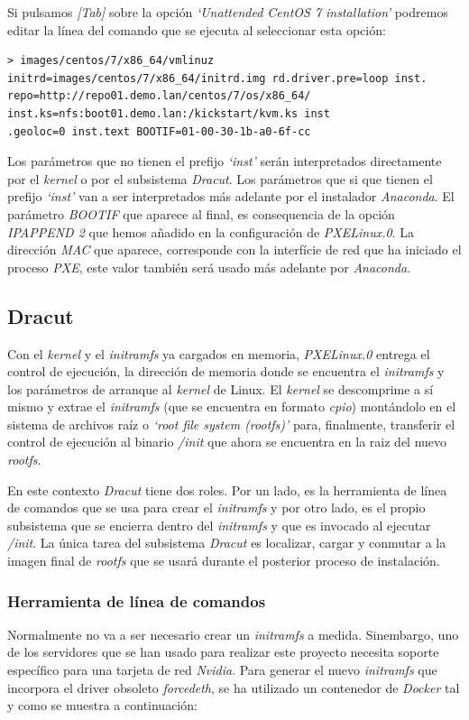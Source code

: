 \documentclass[a4paper,12pt,spanish,final]{epsc_tfc_pfc}
\begin{document}
Si pulsamos \emph{[Tab]} sobre la opción \emph{`Unattended CentOS 7 installation'} podremos editar la línea del comando que se ejecuta al seleccionar esta opción:\\

\begin{lstlisting}[style=dnsmasq]
> images/centos/7/x86_64/vmlinuz initrd=images/centos/7/x86_64/initrd.img rd.driver.pre=loop inst.
repo=http://repo01.demo.lan/centos/7/os/x86_64/ inst.ks=nfs:boot01.demo.lan:/kickstart/kvm.ks inst
.geoloc=0 inst.text BOOTIF=01-00-30-1b-a0-6f-cc
\end{lstlisting}

Los parámetros que no tienen el prefijo \emph{`inst'} serán interpretados directamente por el \emph{kernel} o por el subsistema \emph{Dracut}. Los parámetros que si que tienen el prefijo \emph{`inst'} van a ser interpretados más adelante por el instalador \emph{Anaconda}. El parámetro \emph{BOOTIF} que aparece al final, es consequencia de la opción \emph{IPAPPEND 2} que hemos añadido en la configuración de \emph{PXELinux.0}. La dirección \emph{MAC} que aparece, corresponde con la interfície de red que ha iniciado el proceso \emph{PXE}, este valor también será usado más adelante por \emph{Anaconda}.

\subsection{Dracut}
Con el \emph{kernel} y el \emph{initramfs} ya cargados en memoria, \emph{PXELinux.0} entrega el control de ejecución, la dirección de memoria donde se encuentra el \emph{initramfs} y los parámetros de arranque al \emph{kernel} de Linux. El \emph{kernel} se descomprime a sí mismo y extrae el \emph{initramfs} (que se encuentra en formato \emph{cpio}) montándolo en el sistema de archivos raíz o \emph{`root file system (rootfs)'} para, finalmente, transferir el control de ejecución al binario \emph{/init} que ahora se encuentra en la raiz del nuevo \emph{rootfs}.

En este contexto \emph{Dracut} tiene dos roles. Por un lado, es la herramienta de línea de comandos que se usa para crear el \emph{initramfs} y por otro lado, es el propio subsistema que se encierra dentro del \emph{initramfs} y que es invocado al ejecutar \emph{/init}. La única tarea del subsistema \emph{Dracut} es localizar, cargar y conmutar a la imagen final de \emph{rootfs} que se usará durante el posterior proceso de instalación.

\subsubsection{Herramienta de línea de comandos}
Normalmente no va a ser necesario crear un \emph{initramfs} a medida. Sinembargo, uno de los servidores que se han usado para realizar este proyecto necesita soporte específico para una tarjeta de red \emph{Nvidia}.
Para generar el nuevo \emph{initramfs} que incorpora el driver obsoleto \emph{forcedeth}, se ha utilizado un contenedor de \emph{Docker} tal y como se muestra a continuación:\\
\end{document}
